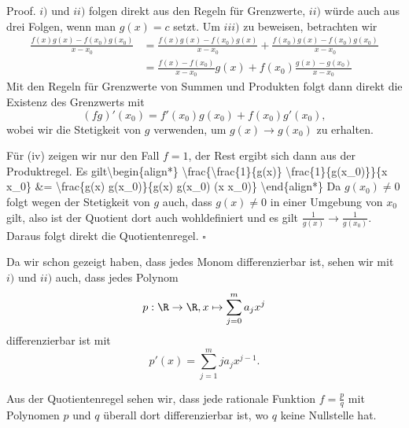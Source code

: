 \documentclass[letterpaper,10pt,english]{jupyterBook}
\begin{document}
\begin{emphBox}{}{}
Proof. \(i)\) und \(ii)\) folgen direkt aus den Regeln für Grenzwerte, \(ii)\) würde auch aus drei Folgen, wenn man \(g(x) =c\) setzt. Um \(iii)\) zu beweisen, betrachten wir
\begin{align*} \frac{f(x)g(x) - f(x_0)g(x_0)}{x-x_0} &= \frac{f(x)g(x) - f(x_0)g(x)}{x-x_0} + \frac{f(x_0)g(x) - f(x_0)g(x_0)}{x-x_0} \\
 &= \frac{f(x)  - f(x_0) }{x-x_0} g(x) + f(x_0) \frac{g(x) - g(x_0)}{x-x_0}
\end{align*}
Mit den Regeln für Grenzwerte von Summen und Produkten folgt dann direkt die Existenz des Grenzwerts mit
\begin{equation*}
 (fg)'(x_0) = f'(x_0) g(x_0) +  f(x_0) g'(x_0),
\end{equation*}
wobei wir die Stetigkeit von \(g\) verwenden, um \(g(x) \rightarrow g(x_0)\) zu erhalten.

Für (iv) zeigen wir nur den Fall \(f=1\), der Rest ergibt sich dann aus der Produktregel. Es gilt\textbackslash{}begin\{align*\}
\textbackslash{}frac\{\textbackslash{}frac\{1\}\{g(x)\}   \textbackslash{}frac\{1\}\{g(x\_0)\}\}\{x x\_0\} \&=   \textbackslash{}frac\{g(x)   g(x\_0)\}\{g(x) g(x\_0) (x x\_0)\} \textbackslash{}end\{align*\}
Da \(g(x_0) \neq 0\) folgt wegen der Stetigkeit von \(g\) auch, dass \(g(x) \neq 0\) in einer Umgebung von \(x_0\) gilt, also ist der Quotient dort auch wohldefiniert und es gilt \(\frac{1}{g(x)} \rightarrow \frac{1}{g(x_0)}\). Daraus folgt direkt die Quotientenregel. \(\square\)
\end{emphBox}
\label{differential/kombfkt:example-1}
\begin{example}{}{}



Da wir schon gezeigt haben, dass jedes Monom differenzierbar ist, sehen wir mit \(i)\) und \(ii)\) auch, dass jedes Polynom
\begin{equation*}
 p: \R \rightarrow \R, x \mapsto \sum_{j=0}^m a_j x^j
\end{equation*}
differenzierbar ist mit
\begin{equation*}
 p'(x) = \sum_{j=1}^m j a_j x^{j-1} .
\end{equation*}\end{example}
\label{differential/kombfkt:example-2}
\begin{example}{}{}



Aus der Quotientenregel sehen wir, dass jede rationale Funktion \(f= \frac{p}q\) mit Polynomen \(p\) und \(q\) überall dort differenzierbar ist, wo \(q\) keine Nullstelle hat.
\end{example}
\end{document}
